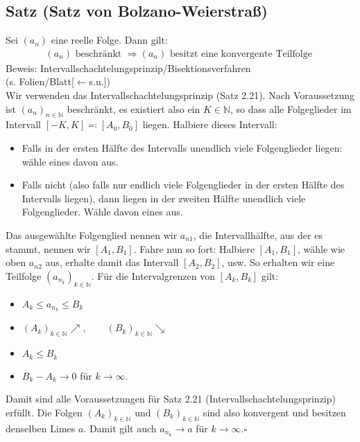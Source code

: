 \documentclass[12pt, titlepage]{article}
\newcommand{\N}{\mathds{N}}
\renewcommand{\>}{\rightarrow}
\renewcommand{\*}{\cdot}
\begin{document}
	\subsection{Satz (Satz von Bolzano-Weierstraß)}
	Sei $(a_n)$ eine reelle Folge. Dann gilt:
	\begin{align*}
		(a_n)\textrm{  beschränkt  }\Rightarrow(a_n)\textrm{  besitzt eine konvergente Teilfolge  }
	\end{align*}
	Beweis: Intervallschachtelungsprinzip/Bisektionsverfahren\\
	(s. Folien/Blatt[$\leftarrow$s.u.])
	\\
	Wir verwenden das Intervallschachtelungsprinzip (Satz 2.21). Nach Voraussetzung ist $(a_n)_{n\in\N}$ beschränkt, es existiert also ein $K\in\N$, so dass alle Folgeglieder im Intervall $[-K,K]\eqqcolon[A_0,B_0]$ liegen. Halbiere dieses Intervall:
	\begin{itemize}
		\item Falls in der ersten Hälfte des Intervalls unendlich viele Folgenglieder liegen: wähle eines davon aus.
		\item Falls nicht (also falls nur endlich viele Folgenglieder in der ersten Hälfte des Intervalls liegen), dann liegen in der zweiten Hälfte unendlich viele Folgenglieder. Wähle davon eines aus.
	\end{itemize}
	Das ausgewählte Folgenglied nennen wir $a_{n1}$, die Intervallhälfte, aus der es stammt, nennen wir $[A_1,B_1]$. Fahre nun so fort: Halbiere $[A_1,B_1]$, wähle wie oben $a_{n2}$ aus, erhalte damit das Intervall $[A_2,B_2]$, usw. So erhalten wir eine Teilfolge $(a_{n_k})_{k\in\N}$. Für die Intervalgrenzen von $[A_k,B_k]$ gilt:
	\begin{itemize}
		\item $A_k\leq a_{n_k}\leq B_k$
		\item $(A_k)_{k\in\N}\nearrow,\qquad(B_k)_{k\in\N}\searrow$
		\item $A_k\leq B_k$
		\item $B_k-A_k\> 0$ für $k\>\infty$. 
	\end{itemize}
	Damit sind alle Voraussetzungen für Satz 2.21 (Intervallschachtelungsprinzip) erfüllt. Die Folgen $(A_k)_{k\in\N}$ und $(B_k)_{k\in\N}$ sind also konvergent und besitzen denselben Limes $a$. Damit gilt auch $a_{n_k}\> a$ für $k\>\infty$.\hfill$\square$
\end{document}
